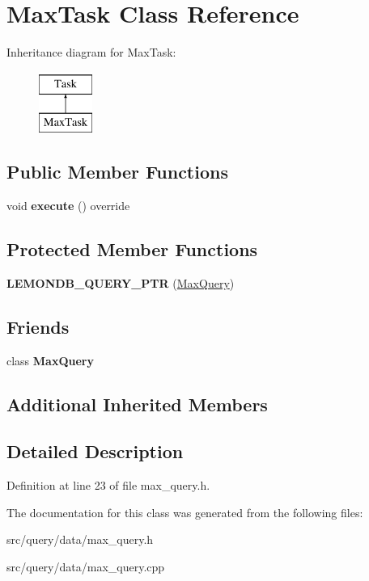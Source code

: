 \hypertarget{class_max_task}{}\section{Max\+Task Class Reference}
\label{class_max_task}
Inheritance diagram for Max\+Task\+:\begin{figure}[H]
\begin{center}
\leavevmode
\includegraphics[height=2.000000cm]{class_max_task}
\end{center}
\end{figure}
\subsection*{Public Member Functions}
\begin{DoxyCompactItemize}
\item 
\mbox{\label{class_max_task_a874e2dd5c362220b5b64a476425a0ca5}} 
void {\bfseries execute} () override
\end{DoxyCompactItemize}
\subsection*{Protected Member Functions}
\begin{DoxyCompactItemize}
\item 
\mbox{\label{class_max_task_a3c4011b788369c1a07ff0f2415d166ed}} 
{\bfseries L\+E\+M\+O\+N\+D\+B\+\_\+\+Q\+U\+E\+R\+Y\+\_\+\+P\+TR} (\hyperlink{class_max_query}{Max\+Query})
\end{DoxyCompactItemize}
\subsection*{Friends}
\begin{DoxyCompactItemize}
\item 
\mbox{\label{class_max_task_a5dd416c177eff007d5ecfaeba2c24505}} 
class {\bfseries Max\+Query}
\end{DoxyCompactItemize}
\subsection*{Additional Inherited Members}


\subsection{Detailed Description}


Definition at line 23 of file max\+\_\+query.\+h.



The documentation for this class was generated from the following files\+:\begin{DoxyCompactItemize}
\item 
src/query/data/max\+\_\+query.\+h\item 
src/query/data/max\+\_\+query.\+cpp\end{DoxyCompactItemize}
